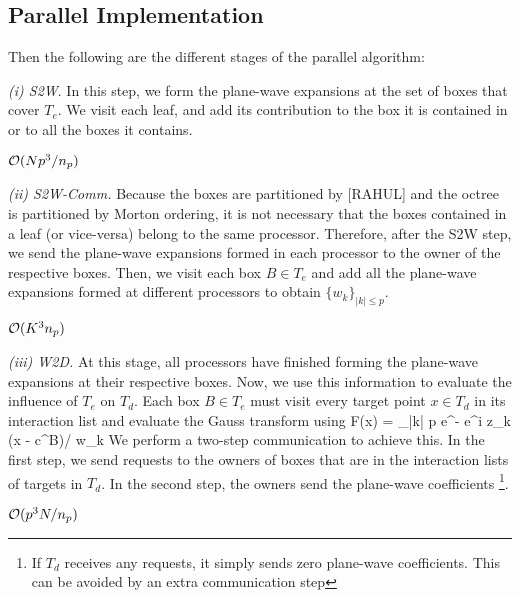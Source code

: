 \subsection{Parallel Implementation}
\label{sc:parallelnufgt}

Then the following are the different stages of the parallel algorithm:

{\em (i) S2W}. In this step, we form the plane-wave expansions at the set of boxes that cover $T_e$. 
We visit each leaf, and add its contribution to the box it is contained in or to all the boxes it contains. 

\hfill $\mathcal{O}(N p^3/n_p)$

{\em (ii) S2W-Comm.} Because the boxes are partitioned by [RAHUL] and the octree is partitioned by Morton ordering, it is not necessary that the boxes contained in a leaf (or vice-versa) belong to the same processor. Therefore, after the S2W step, we send the plane-wave expansions formed in each processor to the owner of the respective boxes. Then, we visit each box $B \in T_e$ and add all the plane-wave expansions formed at different processors to obtain $\{w_k \}_{|k| \leq p}$.  

\hfill $\mathcal{O}(K^3 n_p)$

{\em (iii) W2D.} At this stage, all processors have finished forming the plane-wave expansions at their respective boxes. 
Now, we use this information to evaluate the influence of $T_e$ on $T_d$. Each box $B \in T_e$ must visit every target point $x \in T_d$ in its interaction list and evaluate the Gauss transform using
%
\beq F(x) = \sum_{|k| \leq p} e^{-} e^{i z_k \cdot (x - c^B)/\sqrt{\delta}} w_k \eeq
%
We perform a two-step communication to achieve this. In the first step, we send requests to the owners of boxes that are in the interaction lists of targets in $T_d$. In the second step, the owners send the plane-wave coefficients \footnote{ If $T_d$ receives any requests, it simply sends zero plane-wave coefficients. This can be avoided by an extra communication step}. 

\hfill $\mathcal{O}(p^3 N / n_p)$

